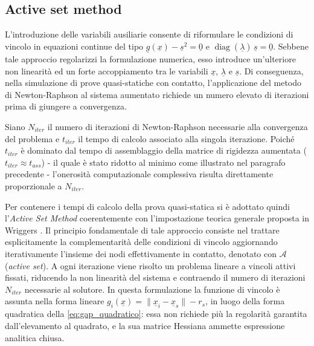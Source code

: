 \subsection{Active set method}
L'introduzione delle variabili ausiliarie consente di riformulare le condizioni di vincolo in equazioni continue del tipo $\underline{g}(\underline{x}) - \underline{s}^2 = \underline{0}$ e $\operatorname{diag}(\underline{\lambda})\,\underline{s} = \underline{0}$. Sebbene tale approccio regolarizzi la formulazione numerica, esso introduce un'ulteriore non linearità ed un forte accoppiamento tra le variabili $\underline{x}$, $\underline{\lambda}$ e $\underline{s}$. Di conseguenza, nella simulazione di prove quasi-statiche con contatto, l'applicazione del metodo di Newton-Raphson al sistema aumentato richiede un numero elevato di iterazioni prima di giungere a convergenza.

Siano $N_{iter}$ il numero di iterazioni di Newton-Raphson necessarie alla convergenza del problema e $t_{iter}$ il tempo di calcolo associato alla singola iterazione. Poiché $t_{iter}$ è dominato dal tempo di assemblaggio della matrice di rigidezza aumentata ($t_{iter} \approx t_{ass}$) - il quale è stato ridotto al minimo come illustrato nel paragrafo precedente - l'onerosità computazionale complessiva risulta direttamente proporzionale a $N_{iter}$. 

Per contenere i tempi di calcolo della prova quasi-statica si è adottato quindi l'\textit{Active Set Method} coerentemente con l'impostazione teorica generale proposta in Wriggers \cite{wriggers2006computational}. Il principio fondamentale di tale approccio consiste nel trattare esplicitamente la complementarità delle condizioni di vincolo aggiornando iterativamente l'insieme dei nodi effettivamente in contatto, denotato con $\mathcal{A}$ (\textit{active set}). A ogni iterazione viene risolto un problema lineare a vincoli attivi fissati, riducendo la non linearità del sistema e contraendo il numero di iterazioni $N_{iter}$ necessarie al solutore. In questa formulazione la funzione di vincolo è assunta nella forma lineare $g_i(\underline{x}) = \|\underline{x}_i - \underline{x}_s\| - r_s$, in luogo della forma quadratica della \eqref{eq:gap_quadratico}: essa non richiede più la regolarità garantita dall'elevamento al quadrato, e la sua matrice Hessiana ammette espressione analitica chiusa.


